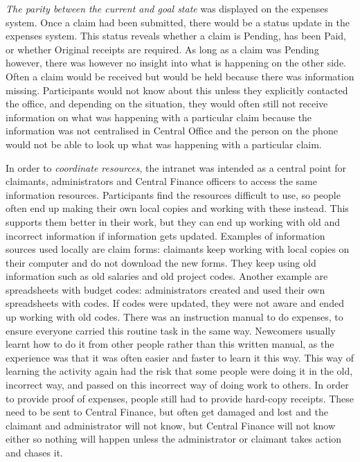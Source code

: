 \textit{The parity between the current and goal state} was displayed on the expenses system. Once a claim had been submitted, there would be a status update in the expenses system. This status reveals whether a claim is Pending, has been Paid, or whether Original receipts are required. As long as a claim was Pending however, there was however no insight into what is happening on the other side. Often a claim would be received but would be held because there was information missing. Participants would not know about this unless they explicitly contacted the office, and depending on the situation, they would often still not receive information on what was happening with a particular claim because the information was not centralised in Central Office and the person on the phone would not be able to look up what was happening with a particular claim.

In order to \textit{coordinate resources}, the intranet was intended as a central point for claimants, administrators and Central Finance officers to access the same information resources. Participants find the resources difficult to use, so people often end up making their own local copies and working with these instead. This supports them better in their work, but they can end up working with old and incorrect information if information gets updated. Examples of information sources used locally are claim forms: claimants keep working with local copies on their computer and do not download the new forms. They keep using old information such as old salaries and old project codes. Another example are spreadsheets with budget codes: administrators created and used their own spreadsheets with codes. If codes were updated, they were not aware and ended up working with old codes. 
There was an instruction manual to do expenses, to ensure everyone carried this routine task in the same way. Newcomers usually learnt how to do it from other people rather than this written manual, as the experience was that it was often easier and faster to learn it this way. This way of learning the activity again had the risk that some people were doing it in the old, incorrect way, and passed on this incorrect way of doing work to others.
In order to provide proof of expenses, people still had to provide hard-copy receipts. These need to be sent to Central Finance, but often get damaged and lost and the claimant and administrator will not know, but Central Finance will not know either so nothing will happen unless the administrator or claimant takes action and chases it. 


